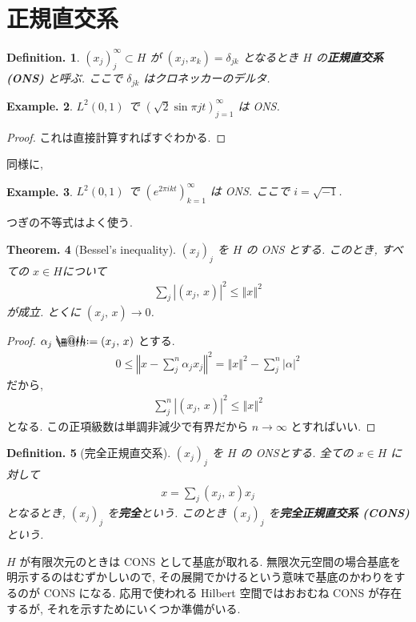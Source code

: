 \documentclass[openany, a4paper, oneside]{jsbook}
\makeatletter
\newcommand*{\defeq}{\mathrel{\rlap{%
\raisebox{0.3ex}{$\m@th\cdot$}}%
\raisebox{-0.3ex}{$\m@th\cdot$}}%
=}
\theoremstyle{break}
\theoremstyle{breakdefn}
\newtheorem{thm}{Theorem.}[section]
\newtheorem{defn}[thm]{Definition.}
\newtheorem{ex}[thm]{Example.}
\newcommand{\abs}[1]{\left|#1\right|}
\newcommand{\norm}[1]{\left\Vert#1\right\Vert}
\newcommand{\rbkt}[2]{\left ( #1,\,#2 \right)}
\makeatother
\begin{document}
\section{正規直交系}


\begin{defn}
$(x_j)_j^{\infty} \subset H$ が $(x_j, x_k) = \delta_{jk}$ となるとき
$H$ の\textbf{正規直交系(ONS)} と呼ぶ.
ここで $\delta_{jk}$ はクロネッカーのデルタ.
\end{defn}
\begin{ex}
$L^2(0, 1)$ で $(\sqrt{2}\sin \pi jt)_{j=1}^{\infty}$ は ONS.
\end{ex}
\begin{proof}
これは直接計算すればすぐわかる.
\end{proof}
同様に,
\begin{ex}
$L^2(0, 1)$ で $(e^{2 \pi i k t})_{k=1}^{\infty}$ は ONS.
ここで $i = \sqrt{-1}$.
\end{ex}

つぎの不等式はよく使う.
\begin{thm}[Bessel's inequality]
 $(x_j)_j$ を $H$ の ONS とする.
 このとき, すべての $x \in H $について
 \begin{align}
  \sum_j \abs{\rbkt{x_j}{x}}^2
  \le
  \norm{x}^2
 \end{align}
 が成立.
 とくに $\rbkt{x_j}{x} \to 0$.
\end{thm}
\begin{proof}
$\alpha_j \defeq \rbkt{x_j}{x}$ とする.
\begin{align}
 0
 \le
 \norm{x - \sum_j^n \alpha_j x_j}^2
 =
 \norm{x}^2 - \sum_j^n \abs{\alpha}^2
\end{align}
だから,
\begin{align}
 \sum_j^n \abs{\rbkt{x_j}{x}}^2
 \leq
 \norm{x}^2
\end{align}
となる.
この正項級数は単調非減少で有界だから $n \to \infty$ とすればいい.
\end{proof}

\begin{defn}[完全正規直交系]
$(x_j)_j$ を $H$ の ONSとする.
全ての $x \in H$ に対して
\begin{align}
 x
 =
 \sum_j \rbkt{x_j}{x} x_j
\end{align}
となるとき, $(x_j)_j$ を\textbf{完全}という.
このとき $(x_j)_j$ を\textbf{完全正規直交系 (CONS)} という.
\end{defn}
$H$ が有限次元のときは CONS として基底が取れる.
無限次元空間の場合基底を明示するのはむずかしいので,
その展開でかけるという意味で基底のかわりをするのが CONS になる.
応用で使われる Hilbert 空間ではおおむね CONS が存在するが,
それを示すためにいくつか準備がいる.
\end{document}
